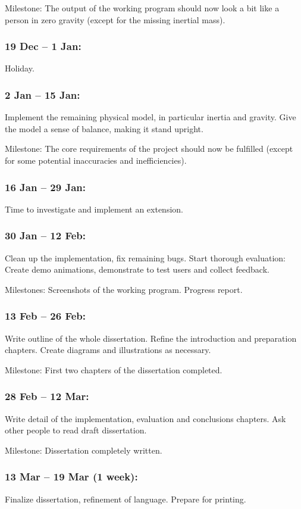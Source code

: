 \documentclass{article}
\begin{document}
Milestone: The output of the working program should now look a bit
like a person in zero gravity (except for the missing inertial mass).

\subsubsection*{19 Dec -- 1 Jan:}
Holiday.

\subsubsection*{2 Jan -- 15 Jan:}
Implement the remaining physical model, in particular inertia and
gravity. Give the model a sense of balance, making it stand upright.

Milestone: The core requirements of the project should now be
fulfilled (except for some potential inaccuracies and inefficiencies).

\subsubsection*{16 Jan -- 29 Jan:}
Time to investigate and implement an extension.

\subsubsection*{30 Jan -- 12 Feb:}
Clean up the implementation, fix remaining bugs. Start thorough
evaluation: Create demo animations, demonstrate to test users and
collect feedback.

Milestones: Screenshots of the working program. Progress report.

\subsubsection*{13 Feb -- 26 Feb:}
Write outline of the whole dissertation. Refine the introduction and
preparation chapters. Create diagrams and illustrations as necessary.

Milestone: First two chapters of the dissertation completed.

\subsubsection*{28 Feb -- 12 Mar:}
Write detail of the implementation, evaluation and conclusions
chapters. Ask other people to read draft dissertation.

Milestone: Dissertation completely written.

\subsubsection*{13 Mar -- 19 Mar (1 week):}
Finalize dissertation, refinement of language. Prepare for printing.
\end{document}
